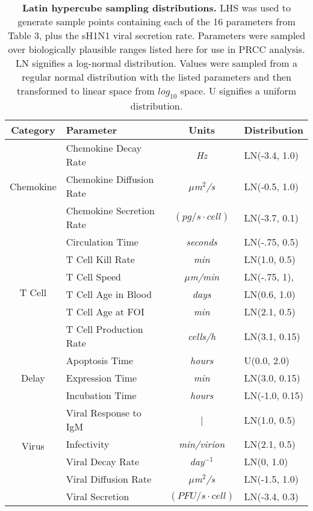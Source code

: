 \documentclass[preprint,10pt,authoryear]{article}
\begin{document}
\begin{table}[!ht]
\centering
\begin{tabular}{| c | l | c | l |}
  \hline                        
  Category & Parameter & Units & Distribution \\
  \hline
  \multirow{3}{*}{Chemokine} & Chemokine Decay Rate & \textit{Hz} &  LN(-3.4, 1.0) \\
  & Chemokine Diffusion Rate & \textit{$\mu$m$^2$/s} & LN(-0.5, 1.0) \\
  & Chemokine Secretion Rate & $(pg/s\cdot cell)$ & LN(-3.7, 0.1) \\
  \hline
  \multirow{6}{*}{T Cell} & Circulation Time & \textit{seconds} & LN(-.75, 0.5)\\
  & T Cell Kill Rate & \textit{min} & LN(1.0, 0.5) \\
  & T Cell Speed & \textit{$\mu$m/min} & LN(-.75, 1), \\
  & T Cell Age in Blood & \textit{days} & LN(0.6, 1.0) \\
  & T Cell Age at FOI& \textit{min} & LN(2.1, 0.5) \\
  & T Cell Production Rate & \textit{cells/h} & LN(3.1, 0.15) \\
  \hline
  \multirow{3}{*}{Delay} & Apoptosis Time & \textit{hours} & U(0.0, 2.0) \\
  & Expression Time & \textit{min} & LN(3.0, 0.15) \\
  & Incubation Time & \textit{hours} & LN(-1.0, 0.15) \\
  \hline 
  \multirow{4}{*}{Virus} & Viral Response to IgM & | & LN(1.0, 0.5) \\
  & Infectivity & \textit{min/virion} & LN(2.1, 0.5) \\
  & Viral Decay Rate &  \textit{day$^{-1}$} & LN(0, 1.0) \\
  & Viral Diffusion Rate & \textit{$\mu$m$^2$/s} & LN(-1.5, 1.0) \\
  & Viral Secretion & $(PFU/s\cdot cell)$ & LN(-3.4, 0.3) \\
  \hline  
\end{tabular}
\caption{\textbf{Latin hypercube sampling distributions.}  LHS was used to generate sample points containing each of the 16 parameters from Table 3, plus the sH1N1 viral secretion rate.  Parameters were sampled over biologically plausible ranges listed here for use in PRCC analysis.  LN signifies a log-normal distribution.  Values were sampled from a regular normal distribution with the listed parameters and then transformed to linear space from $log_{10}$ space.  U signifies a uniform distribution.}
\label{tab:lhs}
\end{table}
 
\end{document}
